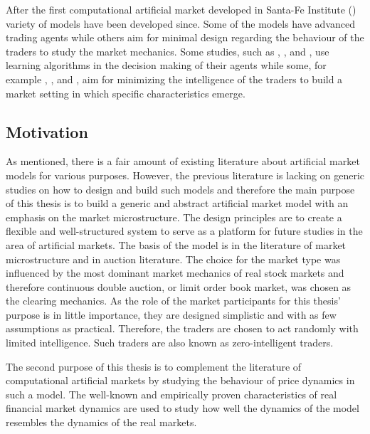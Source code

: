 After the first computational artificial market developed in Santa-Fe Institute
(\citet{SantaFe94}) variety of models have been developed since. Some of the
models have advanced trading agents while others aim for minimal design 
regarding the behaviour of the traders to study the market
mechanics. Some studies, such as \citet{GOYKHMAN20181729}, \citet{IZUMI200535},
\citet{Reinforcement09} and \citet{YEH20102089}, use learning algorithms in the decision making of 
their agents while some, for example \citet{God93}, \citet{Jam96}, \citet{Genoa01} and \citet{Raberto05}, 
aim for minimizing the intelligence of the traders to build a market setting in which
specific characteristics emerge. %



\subsection{Motivation}

As mentioned, there is a fair amount of existing literature about artificial market models for various
purposes. However, the previous literature is lacking on generic studies on how to design
and build such models and therefore the main purpose of this thesis is to build a generic and abstract 
artificial market model with an emphasis on the market microstructure. The design principles are to create a flexible 
and well-structured system to serve as a platform for future studies in the area of artificial markets. 
The basis of the model is in the literature of market microstructure and in auction literature. The choice for the
market type was influenced by the most dominant market mechanics of real stock markets and therefore
continuous double auction, or limit order book market, was chosen as the clearing mechanics. As the 
role of the market participants for this thesis' purpose is in little importance, they are designed
simplistic and with as few assumptions as practical. Therefore, the traders are chosen to act randomly
with limited intelligence. Such traders are also known as zero-intelligent traders. 

The second purpose of this thesis is to complement the literature of computational artificial markets by studying 
the behaviour of price dynamics in such a model.
The well-known and empirically proven characteristics of real financial market dynamics are used to 
study how well the dynamics of the model resembles the dynamics of the real markets.

